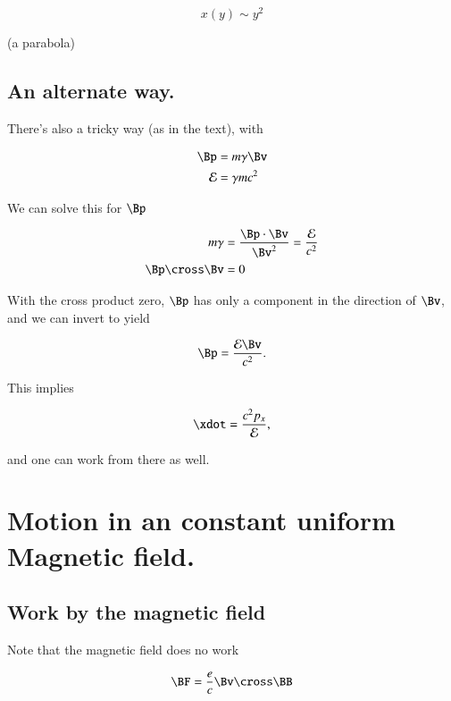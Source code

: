 \begin{equation}\label{eqn:relativisticElectrodynamicsT3:480}
x(y) \sim y^2
\end{equation}

(a parabola)

\subsection{An alternate way.}

There's also a tricky way (as in the text), with 

\begin{align}\label{eqn:relativisticElectrodynamicsT3:160}
\Bp &= m \gamma \Bv  \\
\mathcal{E} &= \gamma m c^2 
\end{align}

We can solve this for $\Bp$

\begin{align*}
m \gamma &= \frac{\Bp \cdot \Bv}{\Bv^2} = \frac{\mathcal{E}}{c^2} \\
\Bp \cross \Bv &= 0
\end{align*}

With the cross product zero, $\Bp$ has only a component in the direction of $\Bv$, and we can invert to yield

\begin{equation}\label{eqn:relativisticElectrodynamicsT3:180}
\Bp = \frac{\mathcal{E} \Bv}{c^2}.
\end{equation}

This implies

\begin{equation}\label{eqn:relativisticElectrodynamicsT3:200}
\xdot = \frac{c^2 p_x}{\mathcal{E}},
\end{equation}

and one can work from there as well.

\section{Motion in an constant uniform Magnetic field.}

\subsection{Work by the magnetic field}

Note that the magnetic field does no work

\begin{equation}\label{eqn:relativisticElectrodynamicsT3:500}
\BF = \frac{e}{c} \Bv \cross \BB
\end{equation}

